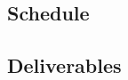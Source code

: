 \documentclass{mprop}
\begin{document}
\par

\subsection{Schedule}

\subsection{Deliverables}

\par 



\end{document}
